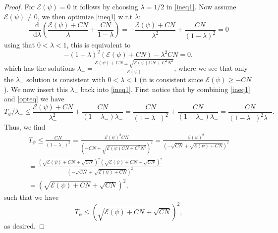 \documentclass[a4paper,11pt]{article}
\newcommand*\diff{\mathop{}\!\mathrm{d}}
\numberwithin{equation}{section}
\begin{document}
 	\begin{proof}
 		For $ \mathcal{E}(\psi)=0 $ it follows by choosing $ \lambda=1/2 $ in \eqref{ineq1}. Now assume $ \mathcal{E}(\psi)\neq0 $,
 		we then optimize \eqref{ineq1} w.r.t $ \lambda $:\begin{equation}
 		\frac{\diff}{\diff\lambda}\left(\frac{\mathcal{E}(\psi)+CN}{\lambda}+\frac{CN}{1-\lambda}\right)=-\frac{\mathcal{E}(\psi)+CN}{\lambda^2}+\frac{CN}{(1-\lambda)^2}=0\label{opteq}
 		\end{equation}
 		using that $ 0<\lambda<1 $, this is equivalent to\begin{equation}
 		-(1-\lambda)^2(\mathcal{E}(\psi)+CN)-\lambda^2CN=0,
 		\end{equation}
 		which has the solutions $ \lambda_\pm=\frac{\mathcal{E}(\psi)+CN\pm\sqrt{\mathcal{E}(\psi)CN+C^2N^2}}{\mathcal{E}(\psi)} $, where we see that only the $ \lambda_- $ solution is consistent with $ 0<\lambda<1 $ (it is consistent since $ \mathcal{E}(\psi)\geq-CN $). We now insert this $ \lambda_- $ back into \eqref{ineq1}. First notice that by combining \eqref{ineq1} and \eqref{opteq} we have 
 		\begin{equation}
 		T_\psi/\lambda_-\leq\frac{\mathcal{E}(\psi)+CN}{\lambda_-^2}+\frac{CN}{(1-\lambda_-)\lambda_- }=\frac{CN}{(1-\lambda_-)^2}+\frac{CN}{(1-\lambda_-)\lambda_-}=\frac{CN}{(1-\lambda_-)^2\lambda_-}.
 		\end{equation}
 		Thus, we find
 		 \begin{equation}
 		\begin{aligned}
 		T_\psi\leq\frac{CN}{(1-\lambda_-)^2}=\frac{\mathcal{E}(\psi)^2CN}{(-CN+\sqrt{\mathcal{E}(\psi)CN+C^2N^2})^2}=\frac{\mathcal{E}(\psi)^2}{(-\sqrt{CN}+\sqrt{\mathcal{E}(\psi)+CN})^2}\\
 		=\frac{(\sqrt{\mathcal{E}(\psi)+CN}+\sqrt{CN})^2(\sqrt{\mathcal{E}(\psi)+CN}-\sqrt{CN})^2}{(-\sqrt{CN}+\sqrt{\mathcal{E}(\psi)+CN})^2}\\=(\sqrt{\mathcal{E}(\psi)+CN}+\sqrt{CN})^2,
 		\end{aligned}
 		\end{equation}
 		such that we have
 		 \begin{equation}
 		T_\psi\leq(\sqrt{\mathcal{E}(\psi)+CN}+\sqrt{CN})^2,
 		\end{equation}
 		as desired.
 	\end{proof}
\end{document}
